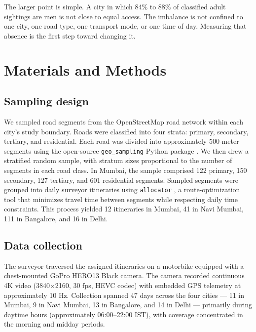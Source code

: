 \documentclass[12pt]{article}
\begin{document}
The larger point is simple. A city in which 84\% to 88\% of classified adult sightings are men is not close to equal access. The imbalance is not confined to one city, one road type, one transport mode, or one time of day. Measuring that absence is the first step toward changing it.


\section{Materials and Methods}

\subsection{Sampling design}

We sampled road segments from the OpenStreetMap road network within each city's study boundary. Roads were classified into four strata: primary, secondary, tertiary, and residential. Each road was divided into approximately 500-meter segments using the open-source \texttt{geo\_sampling} Python package \citep{geo_sampling, streetsense2018}. We then drew a stratified random sample, with stratum sizes proportional to the number of segments in each road class. In Mumbai, the sample comprised 122 primary, 150 secondary, 127 tertiary, and 601 residential segments. Sampled segments were grouped into daily surveyor itineraries using \texttt{allocator} \citep{allocator}, a route-optimization tool that minimizes travel time between segments while respecting daily time constraints. This process yielded 12 itineraries in Mumbai, 41 in Navi Mumbai, 111 in Bangalore, and 16 in Delhi.

\subsection{Data collection}

The surveyor traversed the assigned itineraries on a motorbike equipped with a chest-mounted GoPro HERO13 Black camera. The camera recorded continuous 4K video (3840$\times$2160, 30 fps, HEVC codec) with embedded GPS telemetry at approximately 10 Hz. Collection spanned 47 days across the four cities --- 11 in Mumbai, 9 in Navi Mumbai, 13 in Bangalore, and 14 in Delhi --- primarily during daytime hours (approximately 06:00--22:00 IST), with coverage concentrated in the morning and midday periods.
\end{document}
